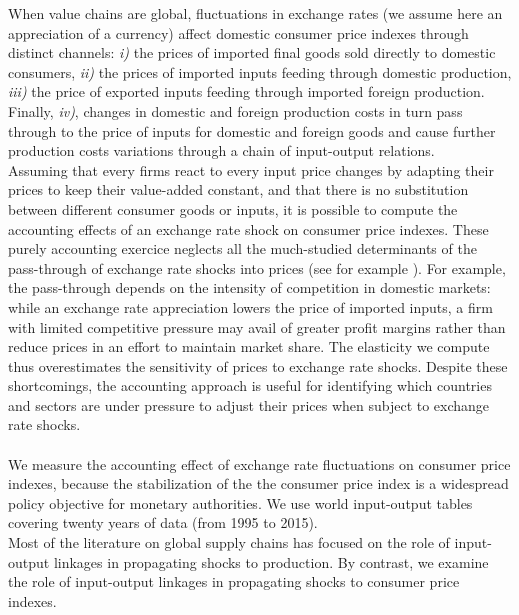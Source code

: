 \documentclass[11pt,a4paper]{article}
\begin{document}
When value chains are global, fluctuations in exchange rates (we assume here an appreciation of a currency) aﬀect domestic consumer price indexes through distinct channels: \textit{i)} the prices of imported ﬁnal goods sold directly to domestic consumers,
\textit{ii)} the prices of imported inputs feeding through domestic production,
\textit{iii)} the price of exported inputs feeding through imported foreign production.
Finally, \textit{iv)}, changes in domestic and foreign production costs in turn pass through to the price of inputs for domestic and foreign goods and cause further production costs variations through a chain of input-output relations.\\
Assuming that every firms react to every input price changes by adapting their prices to keep their value-added constant, and that there is no substitution between different consumer goods or inputs, it is possible to compute the accounting effects of an exchange rate shock on consumer price indexes. These purely accounting exercice neglects all the much-studied determinants of the pass-through of exchange rate shocks into prices (see for example \cite{Berman2012}).
For example, the pass-through depends on the intensity of competition in domestic markets: while an exchange rate appreciation lowers the price of imported inputs, a ﬁrm with limited competitive pressure may avail of greater proﬁt margins rather than reduce prices in an eﬀort to maintain market share.
The elasticity we compute thus overestimates the sensitivity of prices to exchange rate shocks.
Despite these shortcomings, the accounting approach is useful for identifying which countries and sectors are under pressure to adjust their prices when subject to exchange rate shocks.\\
\\
We measure the accounting effect of exchange rate fluctuations on consumer price indexes, because the stabilization of the the consumer price index is a widespread policy objective for monetary authorities. We use world input-output tables covering twenty years of data (from 1995 to 2015).\\
Most of the literature on global supply chains has focused on the role of input-output linkages in propagating shocks to production.
By contrast, we examine the role of input-output linkages in propagating shocks to consumer price indexes.
\end{document}
